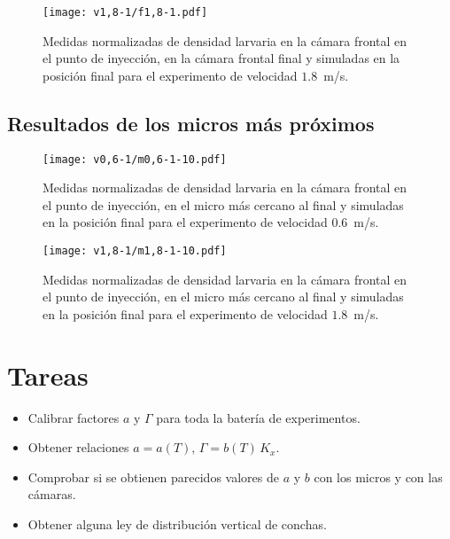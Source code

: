 \documentclass[a4paper]{article}
\begin{document}
\begin{figure}[ht!]
\centering
\texttt{[image: v1,8-1/f1,8-1.pdf]}
\caption{Medidas normalizadas de densidad larvaria en la cámara frontal en el
punto de inyección, en la cámara frontal final y simuladas en la posición final
para el experimento de velocidad $1.8$~m/s.}
\end{figure}

\newpage
\subsection{Resultados de los micros más próximos}

\begin{figure}[ht!]
\centering
\texttt{[image: v0,6-1/m0,6-1-10.pdf]}
\caption{Medidas normalizadas de densidad larvaria en la cámara frontal en el
punto de inyección, en el micro más cercano al final y simuladas en la posición
final para el experimento de velocidad $0.6$~m/s.}
\end{figure}

\begin{figure}[ht!]
\centering
\texttt{[image: v1,8-1/m1,8-1-10.pdf]}
\caption{Medidas normalizadas de densidad larvaria en la cámara frontal en el
punto de inyección, en el micro más cercano al final y simuladas en la posición
final para el experimento de velocidad $1.8$~m/s.}
\end{figure}

\newpage
\section{Tareas}

\begin{itemize}
\item Calibrar factores $a$ y $\Gamma$ para toda la batería de experimentos.
\item Obtener relaciones $a=a(T)$, $\Gamma=b(T)\,K_x$.
\item Comprobar si se obtienen parecidos valores de $a$ y $b$ con los micros y
	con las cámaras.
\item Obtener alguna ley de distribución vertical de conchas.
\end{itemize}
\end{document}
